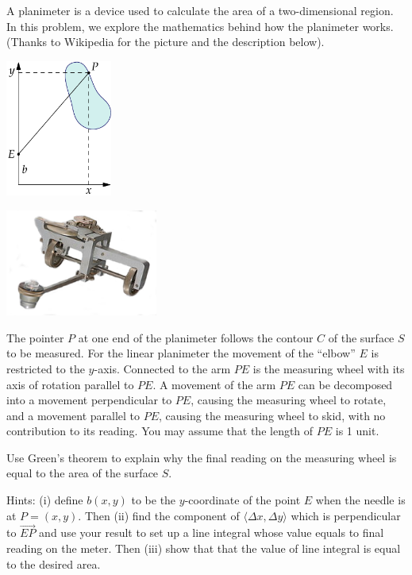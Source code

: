 \documentclass{watsonbook}
\begin{document}
\begin{aexercise} 
  A planimeter is a device used to calculate the area of a
  two-dimensional region. In this problem, we explore the mathematics
  behind how the planimeter works. (Thanks to Wikipedia for the
  picture and the description below).

  \begin{center}
    \begin{minipage}{5cm}
      \includegraphics[width=3.5cm]{exercisefigures/planimeter.pdf}
    \end{minipage} \quad 
    \begin{minipage}{5cm}
      \includegraphics[width=5cm]{exercisefigures/myplanimeter.png}
    \end{minipage}
  \end{center}

  The pointer $P$ at one end of the planimeter follows the contour $C$
  of the surface $S$ to be measured. For the linear planimeter the
  movement of the ``elbow'' $E$ is restricted to the
  $y$-axis. Connected to the arm $PE$ is the measuring wheel with its
  axis of rotation parallel to $PE$. A movement of the arm $PE$ can be
  decomposed into a movement perpendicular to $PE$, causing the
  measuring wheel to rotate, and a movement parallel to $PE$, causing
  the measuring wheel to skid, with no contribution to its
  reading. You may assume that the length of $PE$ is 1 unit.

  Use Green's theorem to explain why the final reading on the
  measuring wheel is equal to the area of the surface $S$.

  Hints: (i) define $b(x,y)$ to be the $y$-coordinate of the point $E$
  when the needle is at $P = (x,y)$. Then (ii) find the component of
  $\langle \Delta x, \Delta y\rangle$ which is perpendicular to
  $\overrightarrow{EP}$ and use your result to set up a line integral
  whose value equals to final reading on the meter. Then (iii) show
  that that the value of line integral is equal to the desired
  area.
\end{aexercise}
\end{document}
